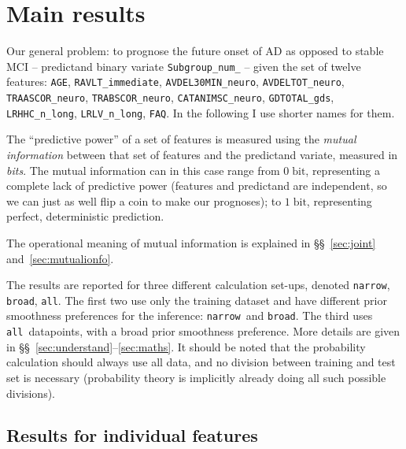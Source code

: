 \documentclass[\ifafour a4paper,12pt,\else a5paper,10pt,\fi%
onecolumn,oneside,article,%
british%
]{memoir}
\theoremstyle{remark}
\theoremstyle{innote}
\renewcommand*{\|}[1][]{\nonscript\:#1\vert\nonscript\:\mathopen{}}
\newcommand*{\sects}{\S\S}%
\newcommand*{\bit}{\textrm{bit}}
\newcommand*{\narrow}{\texttt{narrow}}
\newcommand*{\broad}{\texttt{broad}}
\newcommand*{\all}{\texttt{all}}
\begin{document}
\section{Main results}
\label{sec:main_res}

Our general problem: to prognose the future onset of AD as opposed to
stable MCI -- predictand binary variate \texttt{Subgroup\_num\_} -- given
the set of twelve features: \texttt{AGE}, \texttt{RAVLT\_immediate},
\texttt{AVDEL30MIN\_neuro}, \texttt{AVDELTOT\_neuro},
\texttt{TRAASCOR\_neuro}, \texttt{TRABSCOR\_neuro},
\texttt{CATANIMSC\_neuro}, \texttt{GDTOTAL\_gds}, \texttt{LRHHC\_n\_long},
\texttt{LRLV\_n\_long}, \texttt{FAQ}. In the following I use shorter names
for them.

The \enquote{predictive power} of a set of features is measured using the
\emph{mutual information} between that set of features and the predictand
variate, measured in \emph{bits}. The mutual information can in this case
range from $0\;\bit$, representing a complete lack of predictive power
(features and predictand are independent, so we can just as well flip a
coin to make our prognoses); to $1\;\bit$, representing perfect,
deterministic prediction.

The operational meaning of mutual
information is explained in \sects~\ref{sec:joint} and~\ref{sec:mutualionfo}.

The results are reported for three different calculation set-ups, denoted
\narrow, \broad, \all. The first two use only the training dataset and have
different prior smoothness preferences for the inference: \narrow\ and
\broad. The third uses \all\ datapoints, with a broad prior smoothness
preference. More details are given in
\sects~\ref{sec:understand}--\ref{sec:maths}. It should be noted that the
probability calculation should always use all data, and no division between
training and test set is necessary (probability theory is implicitly
already doing all such possible divisions).


\subsection{Results for individual features}
\label{sec:indiv_features}
\end{document}
